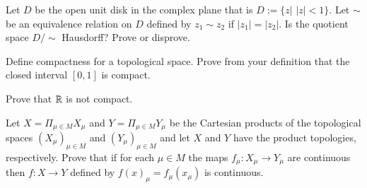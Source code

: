 \documentclass[12pt]{exam}
\theoremstyle{definition}
\newcommand{\R}{\mathcal{R}}
\def\R{{ \Bbb R}}
\begin{document}
\begin{questions}
\question

Let $D$ be the open unit disk in the complex plane that is $D:=\{z | \,\, |z| < 1\}$. Let $\sim{}$ be an
equivalence relation on $D$ defined by $z_1 \sim{ z_2}$ if $|z_1 |=|z_2|$. Is the quotient space $D/\sim{}$
Hausdorff? Prove or disprove.

\question


Define compactness for a topological space. Prove from your definition that the closed interval $[0,1]$ is
compact.

\question

Prove that $\R$ is not compact.






\question

Let $X=\Pi_{\mu \in M}X_{\mu}$ and $Y=\Pi_{\mu \in M}Y_{\mu}$ be the Cartesian products of the topological spaces
$(X_{\mu})_{\mu \in M}$ and $(Y_{\mu})_{\mu \in M}$ and let $X$ and $Y$ have the product topologies, respectively.
Prove that if for each $\mu \in M$ the maps $f_{\mu}:X_{\mu} \rightarrow Y_{\mu}$ are continuous then $f:X
\rightarrow Y$ defined by $f(x)_{\mu}=f_{\mu}(x_{\mu})$ is continuous.


\end{questions}
\end{document}
